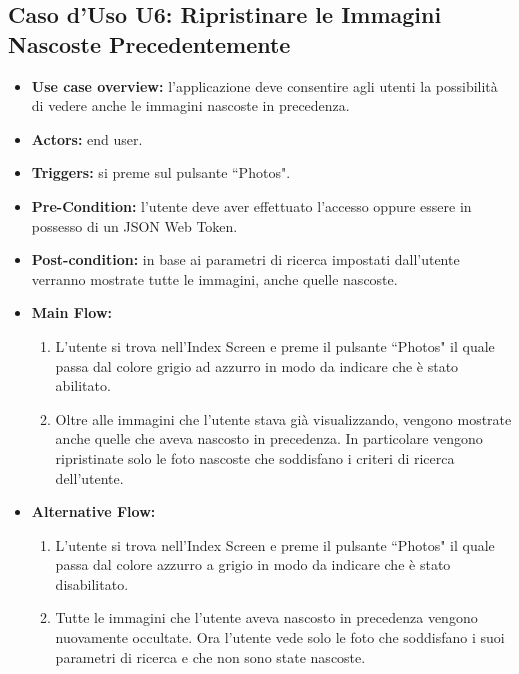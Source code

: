 \subsection*{Caso d'Uso U6: Ripristinare le Immagini Nascoste Precedentemente}
\begin{itemize}
    \item  \textbf{Use case overview:} l'applicazione deve consentire agli utenti la possibilit\`a di vedere anche le immagini nascoste in precedenza.
    \item \textbf{Actors:} end user.
    \item \textbf{Triggers:} si preme sul pulsante ``Photos".
    \item \textbf{Pre-Condition:} l'utente deve aver effettuato l'accesso oppure essere in possesso di un JSON Web Token.
    \item \textbf{Post-condition:} in base ai parametri di ricerca impostati dall'utente verranno mostrate tutte le immagini, anche quelle nascoste.
    \item \textbf{Main Flow:} \begin{enumerate}
              \item L'utente si trova nell'Index Screen e preme il pulsante ``Photos" il quale passa dal colore grigio ad azzurro in modo da indicare che \`e stato abilitato.
              \item Oltre alle immagini che l'utente stava gi\`a visualizzando, vengono mostrate anche quelle che aveva nascosto in precedenza. In particolare vengono ripristinate solo le foto nascoste che soddisfano i criteri di ricerca dell'utente.
          \end{enumerate}
    \item \textbf{Alternative Flow:}\begin{enumerate}
              \item L'utente si trova nell'Index Screen e preme il pulsante ``Photos" il quale passa dal colore azzurro a grigio in modo da indicare che \`e stato disabilitato.
              \item Tutte le immagini che l'utente aveva nascosto in precedenza vengono nuovamente occultate. Ora l'utente vede solo le foto che soddisfano i suoi parametri di ricerca e che non sono state nascoste.

          \end{enumerate}
\end{itemize}